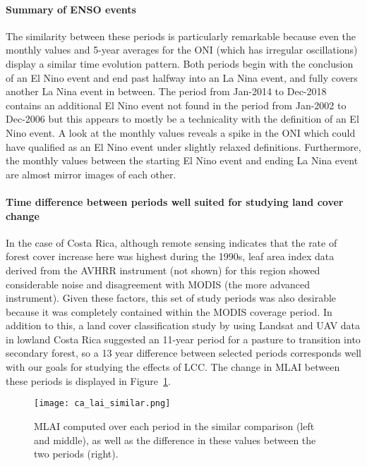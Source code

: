 \paragraph{Summary of ENSO events}

The similarity between these periods is particularly remarkable because even the monthly values and 5-year averages for the \ac{ONI} (which has irregular oscillations) display a similar time evolution pattern. Both periods begin with the conclusion of an El Nino event and end past halfway into an La Nina event, and fully covers another La Nina event in between. The period from Jan-2014 to Dec-2018 contains an additional El Nino event not found in the period from Jan-2002 to Dec-2006 but this appears to mostly be a technicality with the definition of an El Nino event. A look at the monthly values reveals a spike in the \ac{ONI} which could have qualified as an El Nino event under slightly relaxed definitions. Furthermore, the monthly values between the starting El Nino event and ending La Nina event are almost mirror images of each other.

\paragraph{Time difference between periods well suited for studying land cover change}

In the case of Costa Rica, although remote sensing indicates that the rate of forest cover increase here was highest during the 1990s, leaf area index data derived from the \ac{AVHRR} instrument (not shown) for this region showed considerable noise and disagreement with \ac{MODIS} (the more advanced instrument). Given these factors, this set of study periods was also desirable because it was completely contained within the \ac{MODIS} coverage period. In addition to this, a land cover classification study by \citet{marx2017} using Landsat and \ac{UAV} data in lowland Costa Rica suggested an 11-year period for a pasture to transition into secondary forest, so a 13 year difference between selected periods corresponds well with our goals for studying the effects of \ac{LCC}. The change in \ac{MLAI} between these periods is displayed in Figure~\ref{fig:ca_lai_similar}.

\begin{figure}[!ht]
	\centering
	\texttt{[image: ca\_lai\_similar.png]}
	\caption[MLAI similar comparison for CA focus region]{\ac{MLAI} computed over each period in the similar comparison (left and middle), as well as the difference in these values between the two periods (right).}
	\label{fig:ca_lai_similar}
\end{figure}

